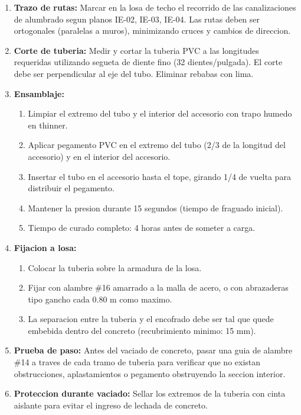 \begin{enumerate}
  \item \textbf{Trazo de rutas:} Marcar en la losa de techo el recorrido de las canalizaciones de alumbrado segun planos IE-02, IE-03, IE-04. Las rutas deben ser ortogonales (paralelas a muros), minimizando cruces y cambios de direccion.
  \item \textbf{Corte de tuberia:} Medir y cortar la tuberia PVC a las longitudes requeridas utilizando segueta de diente fino (32 dientes/pulgada). El corte debe ser perpendicular al eje del tubo. Eliminar rebabas con lima.
  \item \textbf{Ensamblaje:}
  \begin{enumerate}
    \item Limpiar el extremo del tubo y el interior del accesorio con trapo humedo en thinner.
    \item Aplicar pegamento PVC en el extremo del tubo (2/3 de la longitud del accesorio) y en el interior del accesorio.
    \item Insertar el tubo en el accesorio hasta el tope, girando 1/4 de vuelta para distribuir el pegamento.
    \item Mantener la presion durante 15 segundos (tiempo de fraguado inicial).
    \item Tiempo de curado completo: 4 horas antes de someter a carga.
  \end{enumerate}
  \item \textbf{Fijacion a losa:}
  \begin{enumerate}
    \item Colocar la tuberia sobre la armadura de la losa.
    \item Fijar con alambre \#16 amarrado a la malla de acero, o con abrazaderas tipo gancho cada 0.80 m como maximo.
    \item La separacion entre la tuberia y el encofrado debe ser tal que quede embebida dentro del concreto (recubrimiento minimo: 15 mm).
  \end{enumerate}
  \item \textbf{Prueba de paso:} Antes del vaciado de concreto, pasar una guia de alambre \#14 a traves de cada tramo de tuberia para verificar que no existan obstrucciones, aplastamientos o pegamento obstruyendo la seccion interior.
  \item \textbf{Proteccion durante vaciado:} Sellar los extremos de la tuberia con cinta aislante para evitar el ingreso de lechada de concreto.
\end{enumerate}


